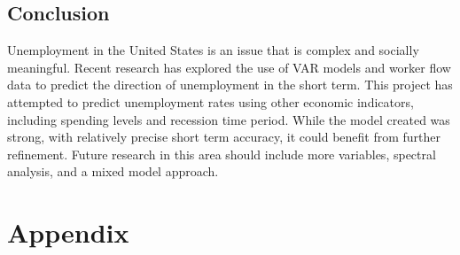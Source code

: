 \documentclass[twoside,twocolumn]{article}
\begin{document}
\subsection{Conclusion}

Unemployment in the United States is an issue that is complex and socially meaningful. Recent research has explored the use of VAR models and worker flow data to predict the direction of unemployment in the short term. This project has attempted to predict unemployment rates using other economic indicators, including spending levels and recession time period. While the model created was strong, with relatively precise short term accuracy, it could benefit from further refinement. Future research in this area should include more variables, spectral analysis, and a mixed model approach.


\begin{flushleft}
\end{flushleft}
\newpage
 \section*{Appendix}
 \appendix
\end{document}
